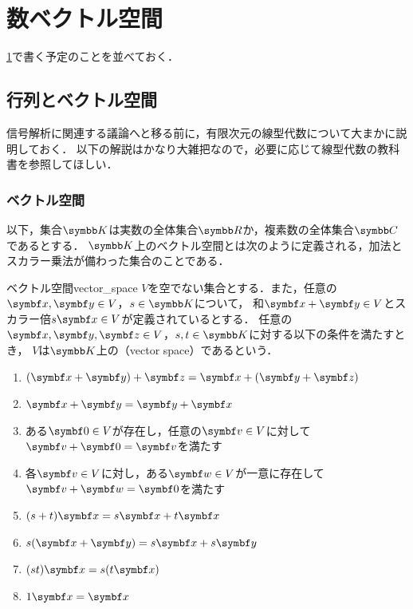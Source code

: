 \documentclass[../../main]{subfiles}
\begin{document}
\chapter{数ベクトル空間}
\label{chapter:numerical_vector_space}

\begin{lead}
  \cref{chapter:numerical_vector_space}で書く予定のことを並べておく．
\end{lead}

\section{行列とベクトル空間}
信号解析に関連する議論へと移る前に，有限次元の線型代数について大まかに説明しておく．
以下の解説はかなり大雑把なので，必要に応じて線型代数の教科書を参照してほしい．

\subsection{ベクトル空間}
以下，集合\(\numset{K}\)は実数の全体集合\(\numset{R}\)か，複素数の全体集合\(\numset{C}\)であるとする．
\(\numset{K}\)上のベクトル空間とは次のように定義される，加法とスカラー乗法が備わった集合のことである．

\begin{definition}{ベクトル空間}{vector_space}
  \(V\)を空でない集合とする．また，任意の\(\vect{x},\vect{y}\in V\)，\(s\in\numset{K}\)について，
  和\(\vect{x}+\vect{y}\in V\)とスカラー倍\(s\vect{x}\in V\)が定義されているとする．
  任意の\(\vect{x},\vect{y},\vect{z}\in V\)，\(s,t\in\numset{K}\)に対する以下の条件を満たすとき，
  \(V\)は\(\numset{K}\)上の（vector space）であるという．

  \begin{enumerate}
    \item \((\vect{x}+\vect{y})+\vect{z}=\vect{x}+(\vect{y}+\vect{z})\)
    \item \(\vect{x}+\vect{y}=\vect{y}+\vect{x}\)
    \item ある\(\zvec\in V\)が存在し，任意の\(\vect{v}\in V\)に対して\(\vect{v}+\zvec=\vect{v}\)を満たす
    \item 各\(\vect{v}\in V\)に対し，ある\(\vect{w}\in V\)が一意に存在して\(\vect{v}+\vect{w}=\zvec\)を満たす
    \item \((s+t)\vect{x}=s\vect{x}+t\vect{x}\)
    \item \(s(\vect{x}+\vect{y})=s\vect{x}+s\vect{y}\)
    \item \((st)\vect{x}=s(t\vect{x})\)
    \item \(1\vect{x}=\vect{x}\)
  \end{enumerate}
\end{definition}
\end{document}
